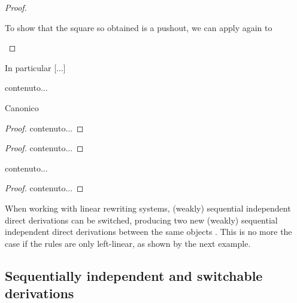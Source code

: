\documentclass[a4paper,UKenglish,cleveref,pdftex, thm-restate,numberwithinsect]{lipics}
\begin{document}
\begin{proof}
\begin{enumerate}
			To show that the square so obtained is a pushout, we can apply again  to 
			\[\]			
			\qedhere 
		\end{enumerate}
\end{proof}


In particular [...]
\begin{definition}
	contenuto...
\end{definition}
\begin{remark}
Canonico
\end{remark}
\begin{corollary}
\end{corollary}
\begin{proof}
	contenuto...
\end{proof}

\begin{lemma}
\end{lemma}
\begin{proof}
	contenuto...
\end{proof}


\begin{lemma}\label{lem:swfill}
\end{lemma}
\begin{remark}
\end{remark}
\begin{remark}
	contenuto...
\end{remark}
\begin{proof}
	contenuto...
\end{proof}




When working with linear rewriting systems, (weakly) sequential independent direct derivations can be switched, producing two new (weakly) sequential independent direct derivations between the same objects \cite[Thm.~$7.7$]{lack2005adhesive} . This is no more the case if the rules are only left-linear, as shown by the next example.

\begin{example}\label{ex:difficile}
\end{example}



\subsection{Sequentially independent and switchable derivations}
\end{document}
